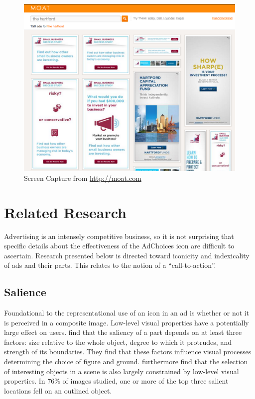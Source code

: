 \begin{figure}
\centerline{
  \includegraphics[scale=.25]{chapter6.tex/moat}
  }
\caption{Screen Capture from \url{http://moat.com}}
\label{moat}
\end{figure}


\section{Related Research}
\label{relatedresearch}

Advertising is an intensely competitive business, so it is not surprising that specific details about the effectiveness of the AdChoices icon are difficult to ascertain. Research presented below is directed toward iconicity and indexicality of ads and their parts. This relates to the notion of a ``call-to-action''.

\subsection{Salience}
\label{salience}

Foundational to the representational use of an icon in an ad is whether or not it is perceived in a composite image. Low-level visual properties have a potentially large effect on users.  \citet*{Hoffman:1997vx}  find that the saliency of a part depends on at least three factors: size relative to the whole object, degree to which it protrudes, and strength of its boundaries. They find that these factors influence visual processes determining the choice of figure and ground.  \citet*{Elazary:2008jk}  furthermore find that the selection of interesting objects in a scene is also largely constrained by low-level visual properties. In 76\% of images studied, one or more of the top three salient locations fell on an outlined object. 

